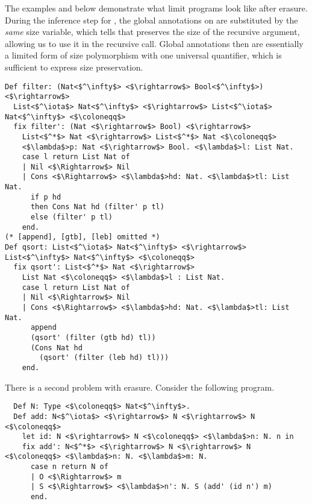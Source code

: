 The examples  and  below demonstrate what limit \lang programs look like after erasure.
During the inference step for , the global annotations on  are substituted by the \textit{same} size variable, which tells  that  preserves the size of the recursive argument, allowing us to use it in the recursive call.
Global annotations then are essentially a limited form of size polymorphism with one universal quantifier, which is sufficient to express size preservation.

\begin{multicols}{2}
\begin{verbatim}
Def filter: (Nat<$^\infty$> <$\rightarrow$> Bool<$^\infty$>) <$\rightarrow$>
  List<$^\iota$> Nat<$^\infty$> <$\rightarrow$> List<$^\iota$> Nat<$^\infty$> <$\coloneqq$>
  fix filter': (Nat <$\rightarrow$> Bool) <$\rightarrow$>
    List<$^*$> Nat <$\rightarrow$> List<$^*$> Nat <$\coloneqq$>
    <$\lambda$>p: Nat <$\rightarrow$> Bool. <$\lambda$>l: List Nat.
    case l return List Nat of
    | Nil <$\Rightarrow$> Nil
    | Cons <$\Rightarrow$> <$\lambda$>hd: Nat. <$\lambda$>tl: List Nat.
      if p hd
      then Cons Nat hd (filter' p tl)
      else (filter' p tl)
    end.
(* [append], [gtb], [leb] omitted *)
Def qsort: List<$^\iota$> Nat<$^\infty$> <$\rightarrow$> List<$^\infty$> Nat<$^\infty$> <$\coloneqq$>
  fix qsort': List<$^*$> Nat <$\rightarrow$>
    List Nat <$\coloneqq$> <$\lambda$>l : List Nat.
    case l return List Nat of
    | Nil <$\Rightarrow$> Nil
    | Cons <$\Rightarrow$> <$\lambda$>hd: Nat. <$\lambda$>tl: List Nat.
      append
      (qsort' (filter (gtb hd) tl))
      (Cons Nat hd
        (qsort' (filter (leb hd) tl)))
    end.
\end{verbatim}
\end{multicols}

There is a second problem with erasure.
Consider the following \lang program.

\begin{verbatim}
  Def N: Type <$\coloneqq$> Nat<$^\infty$>.
  Def add: N<$^\iota$> <$\rightarrow$> N <$\rightarrow$> N <$\coloneqq$>
    let id: N <$\rightarrow$> N <$\coloneqq$> <$\lambda$>n: N. n in
    fix add': N<$^*$> <$\rightarrow$> N <$\rightarrow$> N <$\coloneqq$> <$\lambda$>n: N. <$\lambda$>m: N.
      case n return N of
      | O <$\Rightarrow$> m
      | S <$\Rightarrow$> <$\lambda$>n': N. S (add' (id n') m)
      end.
\end{verbatim}

